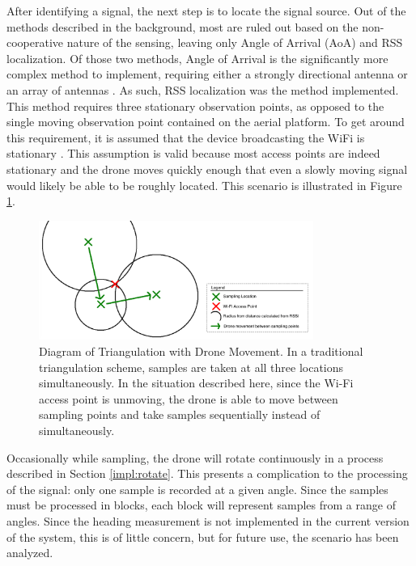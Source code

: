 After identifying a signal, the next step is to locate the signal source. Out of the methods described in the background, most are ruled out based on the non-cooperative nature of the sensing, leaving only Angle of Arrival (AoA) and RSS localization. Of those two methods, Angle of Arrival is the significantly more complex method to implement, requiring either a strongly directional antenna or an array of antennas \cite{local_aoa}. As such, RSS localization was the method implemented. This method requires three stationary observation points, as opposed to the single moving observation point contained on the aerial platform. To get around this requirement, it is assumed that the device broadcasting the WiFi is stationary \cite{rss_calc}. This assumption is valid because most access points are indeed stationary and the drone moves quickly enough that even a slowly moving signal would likely be able to be roughly located. This scenario is illustrated in Figure \ref{fig:drone_triang}. \par
\begin{figure}[ht!]
	\centering
	\includegraphics[width=0.80\textwidth]{img/drone_rss_triang}
	\caption{Diagram of Triangulation with Drone Movement. In a traditional triangulation scheme, samples are taken at all three locations simultaneously. In the situation described here, since the Wi-Fi access point is unmoving, the drone is able to move between sampling points and take samples sequentially instead of simultaneously.}
	\label{fig:drone_triang}
\end{figure}\par
Occasionally while sampling, the drone will rotate continuously in a process described in Section \ref{impl:rotate}. This presents a complication to the processing of the signal: only one sample is recorded at a given angle. Since the samples must be processed in blocks, each block will represent samples from a range of angles. Since the heading measurement is not implemented in the current version of the system, this is of little concern, but for future use, the scenario has been analyzed. \par
